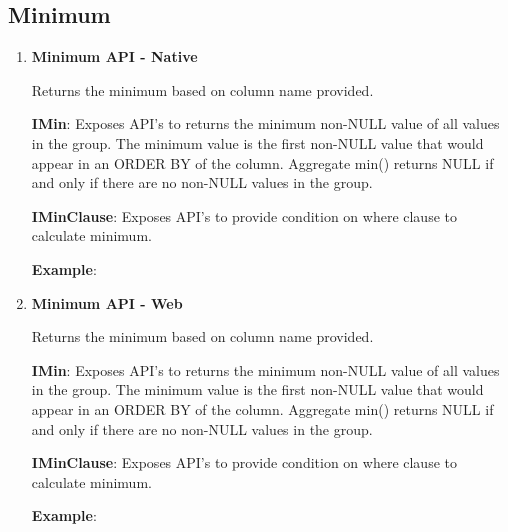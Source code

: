 	\subsection{Minimum} 

		\begin{enumerate}

			\item \small \textbf{Minimum API - Native}
				\par 
				Returns the minimum based on column name provided.
					
		
				\textbf{IMin}:      Exposes API's to returns the minimum non-NULL value of all values in the group.
						The minimum value is the first non-NULL value that would appear in an ORDER BY of the column.
						Aggregate min() returns NULL if and only if there are no non-NULL values in the group.


					

			
				\textbf{IMinClause}: Exposes API's to provide condition on where clause to calculate minimum.
					
	
				\textbf{Example}: 
					

			\item \small \textbf{Minimum API - Web}
				\par 
				Returns the minimum based on column name provided.
					
		
				\textbf{IMin}:      Exposes API's to returns the minimum non-NULL value of all values in the group.
						The minimum value is the first non-NULL value that would appear in an ORDER BY of the column.
						Aggregate min() returns NULL if and only if there are no non-NULL values in the group.


					

			
				\textbf{IMinClause}: Exposes API's to provide condition on where clause to calculate minimum.
					
	
				\textbf{Example}: 
					

		\end{enumerate}




